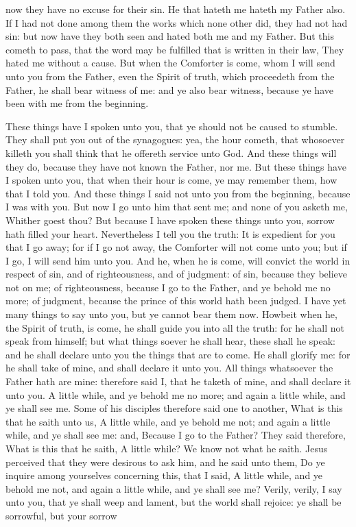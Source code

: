 now they have no excuse for their sin. He that hateth me hateth my Father also. If I had not done among them the works which none other did, they had not had sin: but now have they both seen and hated both me and my Father. But this cometh to pass, that the word may be fulfilled that is written in their law, They hated me without a cause. But when the Comforter is come, whom I will send unto you from the Father, even the Spirit of truth, which proceedeth from the Father, he shall bear witness of me: and ye also bear witness, because ye have been with me from the beginning. 

These things have I spoken unto you, that ye should not be caused to stumble. They shall put you out of the synagogues: yea, the hour cometh, that whosoever killeth you shall think that he offereth service unto God. And these things will they do, because they have not known the Father, nor me. But these things have I spoken unto you, that when their hour is come, ye may remember them, how that I told you. And these things I said not unto you from the beginning, because I was with you. But now I go unto him that sent me; and none of you asketh me, Whither goest thou? But because I have spoken these things unto you, sorrow hath filled your heart. Nevertheless I tell you the truth: It is expedient for you that I go away; for if I go not away, the Comforter will not come unto you; but if I go, I will send him unto you. And he, when he is come, will convict the world in respect of sin, and of righteousness, and of judgment: of sin, because they believe not on me; of righteousness, because I go to the Father, and ye behold me no more; of judgment, because the prince of this world hath been judged. I have yet many things to say unto you, but ye cannot bear them now. Howbeit when he, the Spirit of truth, is come, he shall guide you into all the truth: for he shall not speak from himself; but what things soever he shall hear, these shall he speak: and he shall declare unto you the things that are to come. He shall glorify me: for he shall take of mine, and shall declare it unto you. All things whatsoever the Father hath are mine: therefore said I, that he taketh of mine, and shall declare it unto you. A little while, and ye behold me no more; and again a little while, and ye shall see me. Some of his disciples therefore said one to another, What is this that he saith unto us, A little while, and ye behold me not; and again a little while, and ye shall see me: and, Because I go to the Father? They said therefore, What is this that he saith, A little while? We know not what he saith. Jesus perceived that they were desirous to ask him, and he said unto them, Do ye inquire among yourselves concerning this, that I said, A little while, and ye behold me not, and again a little while, and ye shall see me? Verily, verily, I say unto you, that ye shall weep and lament, but the world shall rejoice: ye shall be sorrowful, but your sorrow 